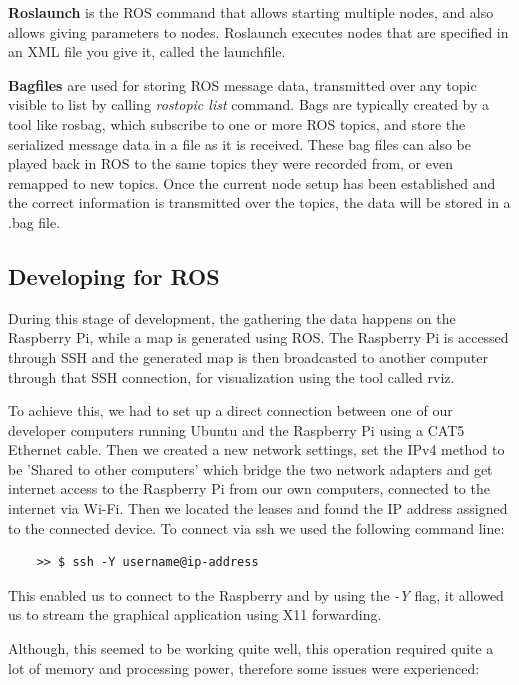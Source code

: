 \textbf{Roslaunch} is the ROS command that allows starting multiple nodes, and also allows giving parameters to nodes. Roslaunch executes nodes that are specified in an XML file you give it, called the launchfile.



\textbf{Bagfiles} are used for storing ROS message data, transmitted over any topic visible to list by calling \textit{rostopic list} command. Bags are typically created by a tool like rosbag, which subscribe to one or more ROS topics, and store the serialized message data in a file as it is received. These bag files can also be played back in ROS to the same topics they were recorded from, or even remapped to new topics. Once the current node setup has been established and the correct information is transmitted over the topics, the data will be stored in a .bag file.

\subsection{Developing for ROS}
During this stage of development, the gathering the data happens on the Raspberry Pi, while a map is generated using ROS. The Raspberry Pi is accessed through SSH and the generated map is then broadcasted to another computer through that SSH connection, for visualization using the tool called rviz. 

To achieve this, we had to set up a direct connection between one of our developer computers running Ubuntu and the Raspberry Pi using a CAT5 Ethernet cable. Then we created a new network settings, set the IPv4 method to be 'Shared to other computers' which bridge the two network adapters and get internet access to the Raspberry Pi from our own computers, connected to the internet via Wi-Fi. Then we located the leases and found the IP address assigned to the connected device. To connect via ssh we used the following command line:
\lstset{language=sh}
\begin{lstlisting}
	>> $ ssh -Y username@ip-address
\end{lstlisting}
This enabled us to connect to the Raspberry and by using the \textit{-Y} flag, it allowed us to stream the graphical application using X11 forwarding.

Although, this seemed to be working quite well, this operation required quite a lot of memory and processing power, therefore some issues were experienced:


